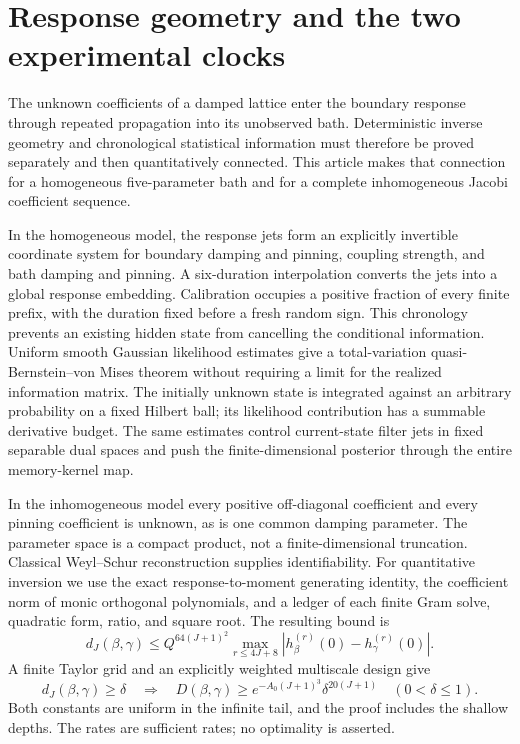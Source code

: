 \section{Response geometry and the two experimental clocks}
\label{sec:introduction}
The unknown coefficients of a damped lattice enter the boundary response
through repeated propagation into its unobserved bath. Deterministic inverse
geometry and chronological statistical information must therefore be proved
separately and then quantitatively connected. This article makes that
connection for a homogeneous five-parameter bath and for a complete
inhomogeneous Jacobi coefficient sequence.

In the homogeneous model, the response jets form an explicitly invertible
coordinate system for boundary damping and pinning, coupling strength, and
bath damping and pinning. A six-duration interpolation converts the jets
into a global response embedding. Calibration occupies a positive fraction
of every finite prefix, with the duration fixed before a fresh random sign.
This chronology prevents an existing hidden state from cancelling the
conditional information. Uniform smooth Gaussian likelihood estimates give
a total-variation quasi-Bernstein--von Mises theorem without requiring a
limit for the realized information matrix. The initially unknown state is
integrated against an arbitrary probability on a fixed Hilbert ball; its
likelihood contribution has a summable derivative budget. The same estimates
control current-state filter jets in fixed separable dual spaces and push
the finite-dimensional posterior through the entire memory-kernel map.

In the inhomogeneous model every positive off-diagonal coefficient and every
pinning coefficient is unknown, as is one common damping parameter. The
parameter space is a compact product, not a finite-dimensional truncation.
Classical Weyl--Schur reconstruction supplies identifiability. For quantitative
inversion we use the exact response-to-moment generating identity, the
coefficient norm of monic orthogonal polynomials, and a ledger of each finite
Gram solve, quadratic form, ratio, and square root. The resulting bound is
\[
 d_J(\beta,\gamma)\le Q^{64(J+1)^2}
 \max_{r\le4J+8}|h_\beta^{(r)}(0)-h_\gamma^{(r)}(0)|.
\]
A finite Taylor grid and an explicitly weighted multiscale design give
\[
 d_J(\beta,\gamma)\ge\delta\quad\Longrightarrow\quad
 D(\beta,\gamma)\ge e^{-A_0(J+1)^3}\delta^{20(J+1)}
 \quad(0<\delta\le1).
\]
Both constants are uniform in the infinite tail, and the proof includes the
shallow depths. The rates are sufficient rates; no optimality is asserted.

